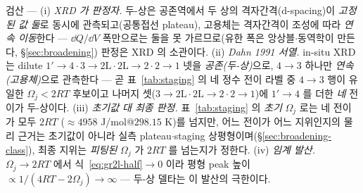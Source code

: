 \begin{verifybox}
검산 --- (i) \emph{XRD 가 판정자.} 두-상은 공존역에서 두 상의 격자간격(d-spacing)이 \emph{고정된 값 둘}로
동시에 관측되고(공통접선 plateau), 고용체는 격자간격이 조성에 따라 \emph{연속 이동}한다 --- $\dd Q/\dd V$
폭만으로는 둘을 못 가르므로(유한 폭은 앙상블$\cdot$동역학이 만든다, \S\ref{sec:broadening}) 판정은 XRD 의
소관이다. (ii) \emph{Dahn 1991 서열.} in-situ XRD\cite{dahn1991} 는 dilute $1'\!\to\!4\cdot3\!\to\!2\mathrm
L\cdot2\mathrm L\!\to\!2\cdot2\!\to\!1$ 넷을 \emph{공존(두-상)}으로, $4\!\to\!3$ 하나만 \emph{연속(고용체)}으로
관측한다 --- 곧 표~\ref{tab:staging} 의 네 정수 전이 라벨 중 $4\!\to\!3$ 행이 유일한 $\Omega_j<2RT$ 후보이고
나머지 셋($3\!\to\!2\mathrm L\cdot2\mathrm L\!\to\!2\cdot2\!\to\!1$)에 $1'\!\to\!4$ 를 더한 \emph{네} 전이가 두-상이다.
(iii) \emph{초기값 대 최종 판정.} 표~\ref{tab:staging} 의 \emph{초기} $\Omega_j$ 로는 네 전이가 모두 $2RT$
($\approx4958$ J/mol@$298.15$ K)를 넘지만, 어느 전이가 어느 지위인지의 물리 근거는 초기값이 아니라 실측
plateau$\cdot$staging 상평형이며(\S\ref{sec:broadening-class}), 최종 지위는 \emph{피팅된} $\Omega_j$ 가
$2RT$ 를 넘는지가 정한다. (iv) \emph{임계 발산.} $\Omega_j\to2RT$ 에서 식~\eqref{eq:gr2l-half}$\to0$ 이라
평형 peak 높이 $\propto1/(4RT-2\Omega_j)\to\infty$ --- 두-상 델타는 이 발산의 극한이다.
\end{verifybox}

